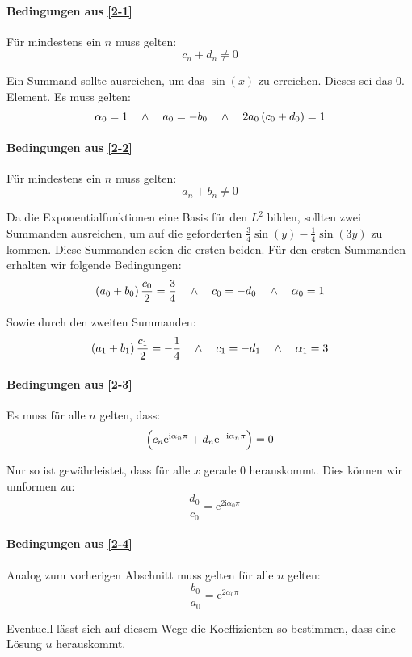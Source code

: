 \documentclass[11pt, ngerman, fleqn]{article}
\newcommand{\ee}{\mathrm e}
\newcommand{\ii}{\mathrm i}
\begin{document}
\paragraph{Bedingungen aus \eqref{2-1}}

Für mindestens ein $n$ muss gelten:
\[
	c_n + d_n \neq 0
\]

Ein Summand sollte ausreichen, um das $\sin(x)$ zu erreichen. Dieses sei das
$0$. Element. Es muss gelten:
\[
	\alpha_0 = 1
	\quad\wedge\quad
	a_0 = - b_0
	\quad\wedge\quad
	2 a_0 \del{c_0 + d_0} = 1
\]

\paragraph{Bedingungen aus \eqref{2-2}}

Für mindestens ein $n$ muss gelten:
\[
	a_n + b_n \neq 0
\]

Da die Exponentialfunktionen eine Basis für den $L^2$ bilden, sollten zwei
Summanden ausreichen, um auf die geforderten $\frac 34 \sin(y) - \frac 14
\sin(3y)$ zu kommen. Diese Summanden seien die ersten beiden. Für den ersten
Summanden erhalten wir folgende Bedingungen:
\[
	\del{a_0 + b_0} \frac{c_0}2 = \frac 34
	\quad\wedge\quad
	c_0 = - d_0
	\quad\wedge\quad
	\alpha_0 = 1
\]

Sowie durch den zweiten Summanden:
\[
	\del{a_1 + b_1} \frac{c_1}{2} = - \frac 14
	\quad\wedge\quad
	c_1 = - d_1
	\quad\wedge\quad
	\alpha_1 = 3
\]

\paragraph{Bedingungen aus \eqref{2-3}}

Es muss für alle $n$ gelten, dass:
\[
	\del{c_n \ee^{\ii \alpha_n \pi} + d_n \ee^{-\ii \alpha_n \pi}} = 0
\]

Nur so ist gewährleistet, dass für alle $x$ gerade $0$ herauskommt. Dies können
wir umformen zu:
\[
	- \frac{d_0}{c_0} = \ee^{2 \ii \alpha_0 \pi}
\]

\paragraph{Bedingungen aus \eqref{2-4}}

Analog zum vorherigen Abschnitt muss gelten für alle $n$ gelten:
\[
	- \frac{b_0}{a_0} = \ee^{2 \alpha_0 \pi}
\]

Eventuell lässt sich auf diesem Wege die Koeffizienten so bestimmen, dass eine
Lösung $u$ herauskommt.
\end{document}
